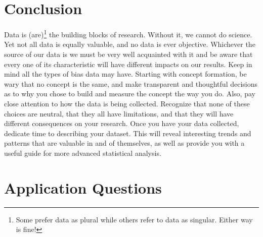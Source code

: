 \documentclass{book}
\begin{document}
\hypertarget{conclusion-2}{%
\section{Conclusion}\label{conclusion-2}}

Data is (are)\footnote{Some prefer data as plural while others refer to data
  as singular. Either way is fine!} the building blocks of research. Without
it, we cannot do science. Yet not all data is equally valuable, and no data is
ever objective. Whichever the source of our data is we must be very well
acquainted with it and be aware that every one of its characteristic will have
different impacts on our results. Keep in mind all the types of bias data may
have. Starting with concept formation, be wary that no concept is the same,
and make transparent and thoughtful decisions as to why you chose to build and
measure the concept the way you do. Also, pay close attention to how the data
is being collected. Recognize that none of these choices are neutral, that
they all have limitations, and that they will have different consequences on
your research. Once you have your data collected, dedicate time to describing
your dataset. This will reveal interesting trends and patterns that are
valuable in and of themselves, as well as provide you with a useful guide for
more advanced statistical analysis.

\hypertarget{application-questions-2}{%
\section{Application Questions}\label{application-questions-2}}
\end{document}
